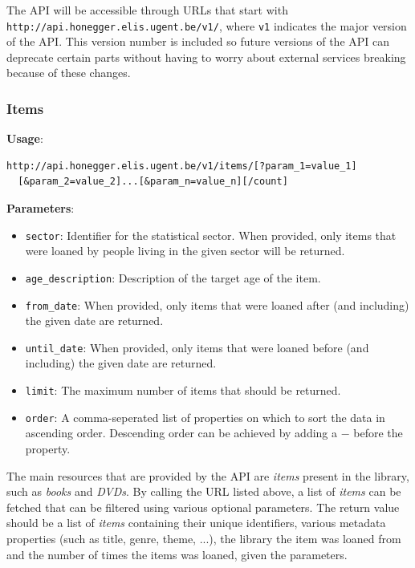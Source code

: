 The API will be accessible through URLs that start with \texttt{http://api.honegger.elis.ugent.be/v1/}, where \texttt{v1} indicates the major version of the API. This version number is included so future versions of the API can deprecate certain parts without having to worry about external services breaking because of these changes.

\subsubsection{Items}

{\bf Usage}:
\begin{verbatim}
http://api.honegger.elis.ugent.be/v1/items/[?param_1=value_1]
  [&param_2=value_2]...[&param_n=value_n][/count]
\end{verbatim}

{\bf Parameters}:
\begin{itemize}
  \item \texttt{sector}: Identifier for the statistical sector. When provided, only items that were loaned by people living in the given sector will be returned.
  \item \texttt{age\_description}: Description of the target age of the item.
  \item \texttt{from\_date}: When provided, only items that were loaned after (and including) the given date are returned.
  \item \texttt{until\_date}: When provided, only items that were loaned before (and including) the given date are returned.
  \item \texttt{limit}: The maximum number of items that should be returned.
  \item \texttt{order}: A comma-seperated list of properties on which to sort the data in ascending order. Descending order can be achieved by adding a $-$ before the property.
\end{itemize}

The main resources that are provided by the API are \emph{items} present in the library, such as \emph{books} and \emph{DVDs}.
By calling the URL listed above, a list of \emph{items} can be fetched that can be filtered using various optional parameters.
The return value should be a list of \emph{items} containing their unique identifiers, various metadata properties (such as title, genre, theme, ...), the library the item was loaned from and the number of times the items was loaned, given the parameters.\\

